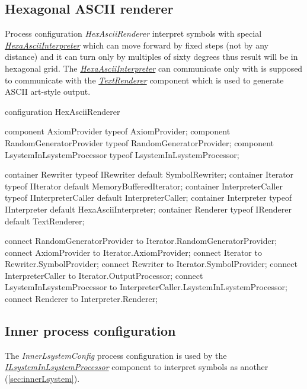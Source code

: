 \subsection{Hexagonal ASCII renderer}

Process configuration \emph{HexAsciiRenderer} interpret symbols with special \hyperref[Malsys.Processing.Components.Interpreters.HexaAsciiInterpreter]{\emph{HexaAsciiInterpreter}}
	which can move forward by fixed steps (not by any distance) and it can turn only by multiples of sixty degrees thus result will be in hexagonal grid.
The \hyperref[Malsys.Processing.Components.Interpreters.HexaAsciiInterpreter]{\emph{HexaAsciiInterpreter}} can communicate only with  is supposed to communicate with
	the \hyperref[Malsys.Processing.Components.Renderers.TextRenderer]{\emph{TextRenderer}} component which is used to generate ASCII art-style output.

\begin{LsystemBreak}
configuration HexAsciiRenderer {
	component AxiomProvider typeof AxiomProvider;
	component RandomGeneratorProvider typeof RandomGeneratorProvider;
	component LsystemInLsystemProcessor typeof LsystemInLsystemProcessor;

	container Rewriter typeof IRewriter default SymbolRewriter;
	container Iterator typeof IIterator default MemoryBufferedIterator;
	container InterpreterCaller typeof IInterpreterCaller default InterpreterCaller;
	container Interpreter typeof IInterpreter default HexaAsciiInterpreter;
	container Renderer typeof IRenderer default TextRenderer;

	connect RandomGeneratorProvider to Iterator.RandomGeneratorProvider;
	connect AxiomProvider to Iterator.AxiomProvider;
	connect Iterator to Rewriter.SymbolProvider;
	connect Rewriter to Iterator.SymbolProvider;
	connect InterpreterCaller to Iterator.OutputProcessor;
	connect LsystemInLsystemProcessor to InterpreterCaller.LsystemInLsystemProcessor;
	connect Renderer to Interpreter.Renderer;
}
\end{LsystemBreak}


\subsection{Inner \lsystem process configuration}
\label{sec:innerLsystemConfig}

The \emph{InnerLsystemConfig} process configuration is used by the \hyperref[Malsys.Processing.Components.Common.ILsystemInLsystemProcessor]{\emph{ILsystemInLsystemProcessor}}
	component to interpret symbols as another \lsystem (\ref{sec:innerLsystem}).

